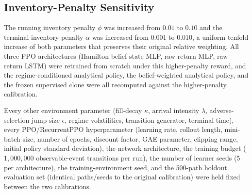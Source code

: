 \subsection{Inventory-Penalty Sensitivity}
\label{subsec:inventory-penalty-sensitivity}

The running inventory penalty $\phi$ was increased from $0.01$ to $0.10$ and the terminal inventory penalty $\alpha$ was increased from $0.001$ to $0.010$, a uniform tenfold increase of both parameters that preserves their original relative weighting. All three PPO architectures (Hamilton belief-state MLP, raw-return MLP, raw-return LSTM) were retrained from scratch under this higher-penalty reward, and the regime-conditioned analytical policy, the belief-weighted analytical policy, and the frozen supervised clone were all recomputed against the higher-penalty calibration.

Every other environment parameter (fill-decay $\kappa$, arrival intensity $\lambda$, adverse-selection jump size $\epsilon$, regime volatilities, transition generator, terminal time), every PPO/RecurrentPPO hyperparameter (learning rate, rollout length, mini-batch size, number of epochs, discount factor, GAE parameter, clipping range, initial policy standard deviation), the network architecture, the training budget ($1{,}000{,}000$ observable-event transitions per run), the number of learner seeds (5 per architecture), the training-environment seed, and the 500-path holdout evaluation set (identical paths/seeds to the original calibration) were held fixed between the two calibrations.

